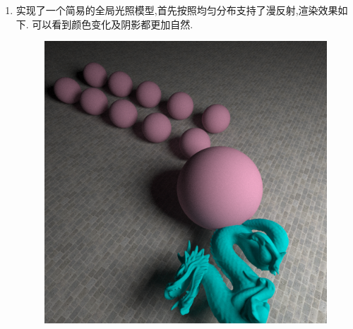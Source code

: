 \begin{enumerate}
    \item 实现了一个简易的全局光照模型,首先按照均匀分布支持了漫反射,渲染效果如下.
      可以看到颜色变化及阴影都更加自然.
      \begin{figure}[H]
        \centering
        \includegraphics[scale=0.4]{img/gllu_first.png}
      \end{figure}



  \end{enumerate}
